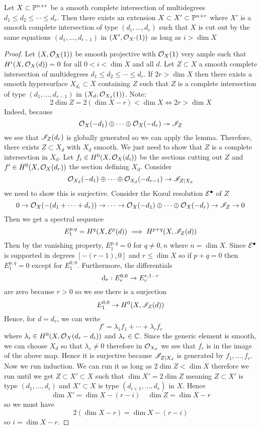 \documentclass[12pt]{article}
\begin{document}
\begin{lemma}
Let $X \subset \P^{n+r}$ be a smooth complete intersection of multidegrees $d_1 \le d_2 \le \cdots \le d_r$. Then there exists an extension $X \subset X' \subset \P^{n+r}$ where $X'$ is a smooth complete intersection of type $(d_{i}, \dots, d_r)$ such that $X$ is cut out by the same equations $(d_1, \dots, d_{i-1})$ in $(X', \struct{X'}(1))$ as long as $i > \dim{X}$
\end{lemma}

\begin{proof}
Let $(X, \struct{X}(1))$ be smooth projective with $\struct{X}(1)$ very ample such that $H^i(X, \struct{X}(d)) = 0$ for all $0 < i < \dim{X}$ and all $d$. Let $Z \subset X$ a smooth complete intersection of multidegrees $d_1 \le d_2 \le \cdots \le d_r$. If $2 r > \dim{X}$ then there exists a smooth hypersurface $X_{d_r} \subset X$ containing $Z$ such that $Z$ is a complete intersection of type $(d_1, \dots, d_{r-1})$ in $(X_d, \struct{X_d}(1))$. Note:
\[ 2 \dim{Z} = 2(\dim{X} - r) < \dim{X} \iff 2 r > \dim{X} \]
Indeed, because
\[ \struct{X}(-d_1) \oplus \cdots \oplus \struct{X}(-d_r) \onto \I_Z \]
we see that $\I_Z(d_r)$ is globally generated so we can apply the lemma. Therefore, there exists $Z \subset X_d$ with $X_d$ smooth. We just need to show that $Z$ is a complete intersection in $X_d$. Let $f_i \in H^0(X, \struct{X}(d_i))$ be the sections cutting out $Z$ and $f' \in H^0(X, \struct{X}(d_r))$ the section defining $X_d$. Consider
\[ \struct{X_d}(-d_1) \oplus \cdots \oplus \struct{X_d}(-d_{r-1}) \to \I_{Z|X_d} \]
we need to show this is surjective. Consider the Kozul resolution $\E^\bullet$ of $Z$
\[ 0 \to \struct{X}(-(d_1 + \cdots + d_r)) \to \cdots \to \struct{X}(-d_1) \oplus \cdots \oplus \struct{X}(-d_r) \to \I_Z \to 0 \]
Then we get a spectral sequence
\[ E_1^{p,q} = H^q(X, \E^p(d)) \implies H^{p+q}(X, \I_Z(d)) \]
Then by the vanishing property, $E^{p,q}_1 = 0$ for $q \neq 0,n$ where $n = \dim{X}$. Since $\E^\bullet$ is supported in degrees $[-(r-1), 0]$ and $r \le \dim{X}$ so if $p + q = 0$ then $E^{p,q}_1 = 0$ except for $E_1^{0,0}$. Furthermore, the differentials
\[ \d_r : E_r^{0,0} \to E_r^{r,1-r} \]
are zero because $r > 0$ so we see there is a surjection
\[ E_1^{0,0} \to H^0(X, \I_Z(d)) \]
Hence, for $d = d_r$, we can write
\[ f' = \lambda_1 f_1 + \cdots + \lambda_r f_r \]
where $\lambda_i \in H^0(X, \struct{X}(d_r - d_i))$ and $\lambda_r \in \CC$. Since the generic element is smooth, we can choose $X_d$ so that $\lambda_r \neq 0$ therefore in $\struct{X_d}$ we see that $f_r$ is in the image of the above map. Hence it is surjective because $\I_{Z|X_d}$ is generated by $f_1, \dots, f_r$. 
\bigskip\\
Now we run induction. We can run it as long as $2 \dim{Z} < \dim{X}$ therefore we run until we get $Z \subset X' \subset X$ such that $\dim{X'} = 2 \dim{Z}$ meaning $Z \subset X'$ is type $(d_1, \dots, d_i)$ and $X' \subset X$ is type $(d_{i+1}, \dots, d_r)$ in $X$. Hence
\[ \dim{X'} = \dim{X} - (r - i) \quad \dim{Z} = \dim{X} - r \]
so we must have
\[ 2 (\dim{X} - r) = \dim{X} - (r - i) \]
so $i = \dim{X} - r$.  
\end{proof}
\end{document}
